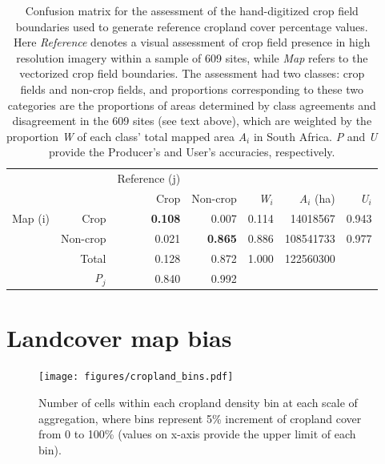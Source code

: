 \documentclass[11pt, titlepage]{article}
\begin{document}
\begin{table}[ht]
\centering
\caption{Confusion matrix for the assessment of the hand-digitized crop field boundaries used to generate reference cropland cover percentage values. Here \emph{Reference} denotes a visual assessment of crop field presence in high resolution imagery within a sample of 609 sites, while \emph{Map} refers to the vectorized crop field boundaries. The assessment had two classes: crop fields and non-crop fields, and proportions corresponding to these two categories are the proportions of areas determined by class agreements and disagreement in the 609 sites (see text above), which are weighted by the proportion \emph{W} of each class' total mapped area \emph{A$_i$} in South Africa. \emph{P} and \emph{U} provide the Producer's and User's accuracies, respectively. }
\begin{tabular}{rrrrrrr}
  \hline
  & & Reference (j) & & & & \\\cline{3-7}
  & & Crop & Non-crop & \emph{W}$_i$ & \emph{A}$_i$ (ha) & \emph{U}$_i$ \\ 
  \hline
  Map (i) & Crop & \textbf{0.108} & 0.007 & 0.114 & 14018567 & 0.943 \\ 
  & Non-crop & 0.021 & \textbf{0.865} & 0.886 & 108541733 & 0.977 \\ 
  & Total & 0.128 & 0.872 & 1.000 & 122560300 &  \\ 
  & \emph{P}$_j$ & 0.840 & 0.992 &  &  &  \\ 
   \hline
\end{tabular}
\end{table}

\section*{Landcover map bias}



\begin{figure}[ht]
  \centering
     \texttt{[image: figures/cropland\_bins.pdf]} 
      \caption{Number of cells within each cropland density bin at each scale of aggregation, where bins represent 5\% increment of cropland cover from 0 to 100\% (values on x-axis provide the upper limit of each bin).}
      \label{fig:default}
\end{figure}



\end{document}
